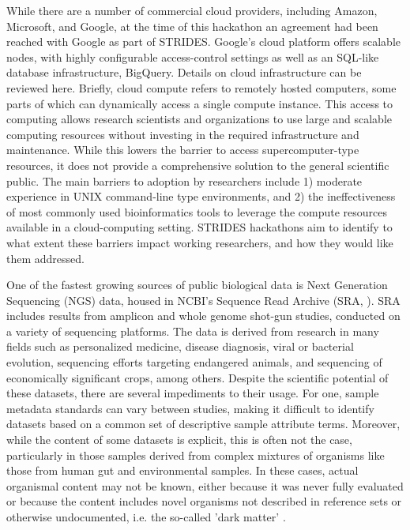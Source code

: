 \documentclass[genes, moreauthors]{Definitions/mdpi}
\begin{document}
  While there are a number of commercial cloud providers, including Amazon,
  Microsoft, and Google, at the time of this hackathon an agreement had been
  reached with Google as part of STRIDES. Google's cloud platform offers
  scalable nodes, with highly configurable access-control settings as well as
  an SQL-like database infrastructure, BigQuery. Details on cloud
  infrastructure can be reviewed here. Briefly, cloud compute refers to
  remotely hosted computers, some parts of which can dynamically access a
  single compute instance. This access to computing allows research scientists
  and organizations to use large and scalable computing resources without
  investing in the required infrastructure and maintenance. While this lowers
  the barrier to access supercomputer-type resources, it does not provide a
  comprehensive solution to the general scientific public. The main barriers to
  adoption by researchers include 1) moderate experience in UNIX command-line
  type environments, and 2) the ineffectiveness of most commonly used
  bioinformatics tools to leverage the compute resources available in a
  cloud-computing setting. STRIDES hackathons aim to identify to what extent
  these barriers impact working researchers, and how they would like them
  addressed.

  One of the fastest growing sources of public biological data is Next
  Generation Sequencing (NGS) data, housed in NCBI's Sequence Read Archive
  (SRA, \cite{Leinonen2010}). SRA includes results from amplicon and whole
  genome shot-gun studies, conducted on a variety of sequencing platforms. The
  data is derived from research in many fields such as personalized medicine,
  disease diagnosis, viral or bacterial evolution, sequencing efforts targeting
  endangered animals, and sequencing of economically significant crops, among
  others. Despite the scientific potential of these datasets, there are several
  impediments to their usage. For one, sample metadata standards can vary
  between studies, making it difficult to identify datasets based on a common
  set of descriptive sample attribute terms. Moreover, while the content of
  some datasets is explicit, this is often not the case, particularly in those
  samples derived from complex mixtures of organisms like those from human gut
  and environmental samples.  In these cases, actual organismal content may not
  be known, either because it was never fully evaluated or because the content
  includes novel organisms not described in reference sets or otherwise
  undocumented, i.e. the so-called 'dark matter' \cite{Roux2015}.
\end{document}
